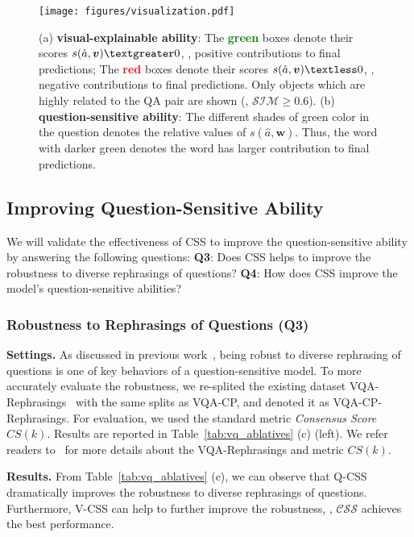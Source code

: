 \documentclass[10pt,twocolumn,letterpaper]{article}
\begin{document}
\begin{figure*}[htbp]
	\centering
	\texttt{[image: figures/visualization.pdf]}
	\vspace{-0.5em}
	\caption{(a) \textbf{visual-explainable ability}: The \textcolor{green}{\textbf{green}} boxes denote their scores $s(\hat{a}, \bm{v}) \textgreater 0$, \ie, positive contributions to final predictions; The \textcolor{red}{\textbf{red}} boxes denote their scores $s(\hat{a}, \bm{v}) \textless 0$, \ie, negative contributions to final predictions. Only objects which are highly related to the QA pair are shown (\ie, $\mathcal{SIM} \geq 0.6$). (b) \textbf{question-sensitive ability}: The different shades of green color in the question denotes the relative values of $s(\hat{a}, \bm{w})$. Thus, the word with darker green denotes the word has larger contribution to final predictions.}
	\label{fig:5}
\end{figure*}

\subsection{Improving Question-Sensitive Ability}
We will validate the effectiveness of CSS to improve the question-sensitive ability by answering the following questions: \textbf{Q3}: Does CSS helps to improve the robustness to diverse rephrasings of questions? \textbf{Q4}: How does CSS improve the model's question-sensitive abilities?

\subsubsection{Robustness to Rephrasings of Questions (Q3)}
\noindent\textbf{Settings.} As discussed in previous work~\cite{shah2019cycle}, being robust to diverse rephrasing of questions is one of key behaviors of a question-sensitive model. To more accurately evaluate the robustness, we re-splited the existing dataset VQA-Rephrasings~\cite{shah2019cycle} with the same splits as VQA-CP, and denoted it as VQA-CP-Rephrasings. For evaluation, we used the standard metric \emph{Consensus Score} $CS(k)$. Results are reported in Table~\ref{tab:vq_ablatives} (c) (left). We refer readers to~\cite{shah2019cycle} for more details about the VQA-Rephrasings and metric $CS(k)$.

\noindent\textbf{Results.} From Table~\ref{tab:vq_ablatives} (c), we can observe that Q-CSS dramatically improves the robustness to diverse rephrasings of questions. Furthermore, V-CSS can help to further improve the robustness, \ie, $\mathcal{CSS}$ achieves the best performance.
\end{document}
